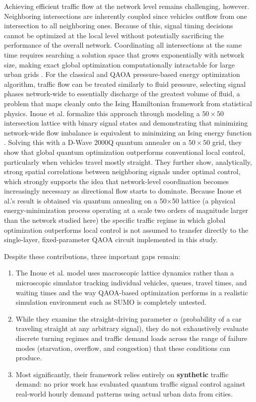 \documentclass[12pt]{article}
\begin{document}
Achieving efficient traffic flow at the network level remains challenging, however. Neighboring intersections are inherently coupled since vehicles outflow from one intersection to all neighboring ones. Because of this, signal timing decisions cannot be optimized at the local level without potentially sacrificing the performance of the overall network. Coordinating all intersections at the same time requires searching a solution space that grows exponentially with network size, making exact global optimization computationally intractable for large urban grids \cite{garey1979}. For the classical and QAOA pressure-based energy optimization algorithm, traffic flow can be treated similarly to fluid pressure, selecting signal phases network-wide to essentially discharge of the greatest volume of fluid, a problem that maps cleanly onto the Ising Hamiltonian framework from statistical physics. Inoue et al. formalize this approach through modeling a $50 \times 50$ intersection lattice with binary signal states and demonstrating that minimizing network-wide flow imbalance is equivalent to minimizing an Ising energy function \cite{inoue2021}. Solving this with a D-Wave 2000Q quantum annealer on a $50 \times 50$ grid, they show that global quantum optimization outperforms conventional local control, particularly when vehicles travel mostly straight. They further show, analytically, strong spatial correlations between neighboring signals under optimal control, which strongly supports the idea that network-level coordination becomes increasingly necessary as directional flow starts to dominate. Because Inoue et al.'s result is obtained via quantum annealing on a 50×50 lattice (a physical energy-minimization process operating at a scale two orders of magnitude larger than the network studied here) the specific traffic regime in which global optimization outperforms local control is not assumed to transfer directly to the single-layer, fixed-parameter QAOA circuit implemented in this study. 

Despite these contributions, three important gaps remain:

\begin{enumerate}
\item The Inoue et al. model uses macroscopic lattice dynamics rather than a microscopic simulator tracking individual vehicles, queues, travel times, and waiting times and the way QAOA-based optimization performs in a realistic simulation environment such as SUMO is completely untested.

\item While they examine the straight-driving parameter $\alpha$ (probability of a car traveling straight at any arbitrary signal), they do not exhaustively evaluate discrete turning regimes and traffic demand loads across the range of failure modes (starvation, overflow, and congestion) that these conditions can produce.

\item Most significantly, their framework relies entirely on \textbf{synthetic} traffic demand: no prior work has evaluated quantum traffic signal control against real-world hourly demand patterns using actual urban data from cities.
\end{enumerate}
\end{document}
